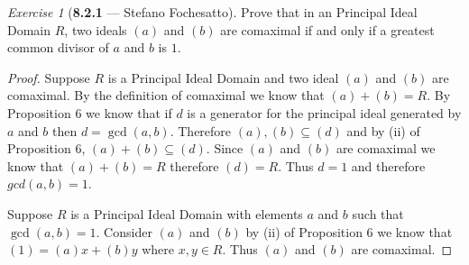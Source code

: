 \documentclass[12pt]{amsart}
\theoremstyle{remark}
\newtheorem*{exercise}{Exercise}%
\theoremstyle{mycomment}
\begin{document}
\begin{exercise}[\textbf{8.2.1} --- Stefano Fochesatto]  Prove that in an Principal Ideal Domain $R$, two ideals $(a)$ and $(b)$ 
  are comaximal if and only if a greatest common divisor of $a$ and $b$ is $1$. 
    \begin{proof} Suppose $R$ is a Principal Ideal Domain and two ideal $(a)$ and $(b)$ 
      are comaximal. By the definition of comaximal we know that $(a) + (b) = R$. By Proposition 6 we know that if 
      $d$ is a generator for the principal ideal generated by $a$ and $b$ then $d = \gcd(a, b)$. Therefore $(a), (b) \subseteq (d)$ and 
      by (ii) of Proposition 6, $(a) + (b) \subseteq (d)$. Since $(a)$ and $(b)$ are comaximal we know that $(a) + (b) = R$ therefore $(d) = R$. 
      Thus $d = 1$ and therefore $gcd(a, b) = 1$. 

      Suppose $R$ is a Principal Ideal Domain with elements $a$ and $b$ such that $\gcd(a, b) = 1$.  Consider 
      $(a)$ and $(b)$ by (ii) of Proposition 6 we know that $(1) = (a)x + (b)y$ where $x, y \in R$. Thus $(a)$ and $(b)$
      are comaximal. 
    

    \end{proof}

\end{exercise}
\vspace{.5in}
\end{document}
